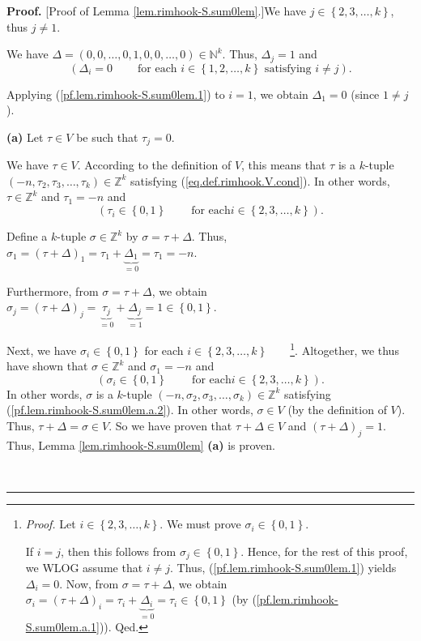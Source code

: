 \documentclass[numbers=enddot,12pt,final,onecolumn,notitlepage]{scrartcl}%
\theoremstyle{definition}
\newenvironment{proof}[1][Proof]{\noindent\textbf{#1.} }{\ \rule{0.5em}{0.5em}}
\begin{document}
\begin{proof}
[Proof of Lemma \ref{lem.rimhook-S.sum0lem}.]We have $j\in\left\{
2,3,\ldots,k\right\}  $, thus $j\neq1$.

We have $\Delta=\left(  0,0,\ldots,0,1,0,0,\ldots,0\right)  \in\mathbb{N}^{k}%
$. Thus, $\Delta_{j}=1$ and%
\begin{equation}
\left(  \Delta_{i}=0\ \ \ \ \ \ \ \ \ \ \text{for each }i\in\left\{
1,2,\ldots,k\right\}  \text{ satisfying }i\neq j\right)  .
\label{pf.lem.rimhook-S.sum0lem.1}%
\end{equation}


Applying (\ref{pf.lem.rimhook-S.sum0lem.1}) to $i=1$, we obtain $\Delta_{1}=0$
(since $1\neq j$).

\textbf{(a)} Let $\tau\in V$ be such that $\tau_{j}=0$.

We have $\tau\in V$. According to the definition of $V$, this means that
$\tau$ is a $k$-tuple $\left(  -n,\tau_{2},\tau_{3},\ldots,\tau_{k}\right)
\in\mathbb{Z}^{k}$ satisfying (\ref{eq.def.rimhook.V.cond}). In other words,
$\tau\in\mathbb{Z}^{k}$ and $\tau_{1}=-n$ and%
\begin{equation}
\left(  \tau_{i}\in\left\{  0,1\right\}  \ \ \ \ \ \ \ \ \ \ \text{for each
}i\in\left\{  2,3,\ldots,k\right\}  \right)  .
\label{pf.lem.rimhook-S.sum0lem.a.1}%
\end{equation}


Define a $k$-tuple $\sigma\in\mathbb{Z}^{k}$ by $\sigma=\tau+\Delta$. Thus,
$\sigma_{1}=\left(  \tau+\Delta\right)  _{1}=\tau_{1}+\underbrace{\Delta_{1}%
}_{=0}=\tau_{1}=-n$.

Furthermore, from $\sigma=\tau+\Delta$, we obtain $\sigma_{j}=\left(
\tau+\Delta\right)  _{j}=\underbrace{\tau_{j}}_{=0}+\underbrace{\Delta_{j}%
}_{=1}=1\in\left\{  0,1\right\}  $.

Next, we have $\sigma_{i}\in\left\{  0,1\right\}  $ for each $i\in\left\{
2,3,\ldots,k\right\}  $\ \ \ \ \footnote{\textit{Proof.} Let $i\in\left\{
2,3,\ldots,k\right\}  $. We must prove $\sigma_{i}\in\left\{  0,1\right\}  $.
\par
If $i=j$, then this follows from $\sigma_{j}\in\left\{  0,1\right\}  $. Hence,
for the rest of this proof, we WLOG assume that $i\neq j$. Thus,
(\ref{pf.lem.rimhook-S.sum0lem.1}) yields $\Delta_{i}=0$. Now, from
$\sigma=\tau+\Delta$, we obtain $\sigma_{i}=\left(  \tau+\Delta\right)
_{i}=\tau_{i}+\underbrace{\Delta_{i}}_{=0}=\tau_{i}\in\left\{  0,1\right\}  $
(by (\ref{pf.lem.rimhook-S.sum0lem.a.1})). Qed.}. Altogether, we thus have
shown that $\sigma\in\mathbb{Z}^{k}$ and $\sigma_{1}=-n$ and
\begin{equation}
\left(  \sigma_{i}\in\left\{  0,1\right\}  \ \ \ \ \ \ \ \ \ \ \text{for each
}i\in\left\{  2,3,\ldots,k\right\}  \right)  .
\label{pf.lem.rimhook-S.sum0lem.a.2}%
\end{equation}
In other words, $\sigma$ is a $k$-tuple $\left(  -n,\sigma_{2},\sigma
_{3},\ldots,\sigma_{k}\right)  \in\mathbb{Z}^{k}$ satisfying
(\ref{pf.lem.rimhook-S.sum0lem.a.2}). In other words, $\sigma\in V$ (by the
definition of $V$). Thus, $\tau+\Delta=\sigma\in V$. So we have proven that
$\tau+\Delta\in V$ and $\left(  \tau+\Delta\right)  _{j}=1$. Thus, Lemma
\ref{lem.rimhook-S.sum0lem} \textbf{(a)} is proven.


\end{proof}
\end{document}
